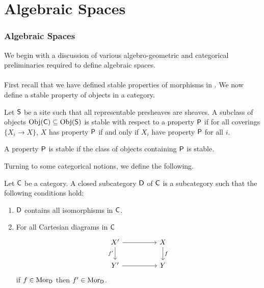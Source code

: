 \part*{Algebraic Spaces}\label{part: algebraic spaces}
\section{Algebraic Spaces}\label{sec: algebraic spaces}
We begin with a discussion of various algebro-geometric and categorical preliminaries required to define algebraic spaces. 
\\\\
First recall that we have defined stable properties of morphisms in . We now define a stable property of objects in a category. 
\begin{definition}\label{def: stable class of objects}
    Let $\mathsf{S}$ be a site such that all representable presheaves are sheaves. A subclass of objects $\mathrm{Obj}(\mathsf{C})\subseteq\mathrm{Obj}(\mathsf{S})$ is stable with respect to a property $\mathsf{P}$ if for all coverings $\{X_{i}\to X\}$, $X$ has property $\mathsf{P}$ if and only if $X_{i}$ have property $\mathsf{P}$ for all $i$. 
\end{definition}
\begin{definition}\label{def: stable property of objects}
    A property $\mathsf{P}$ is stable if the class of objects containing $\mathsf{P}$ is stable.
\end{definition}
Turning to some categorical notions, we define the following. 
\begin{definition}\label{def: closed subcategory}
    Let $\mathsf{C}$ be a category. A closed subcategory $\mathsf{D}$ of $\mathsf{C}$ is a subcategory such that the following conditions hold:
    \begin{enumerate}[label=(\alph*)]
        \item $\mathsf{D}$ contains all isomorphisms in $\mathsf{C}$.
        \item For all Cartesian diagrams in $\mathsf{C}$
        $$%
        \begin{tikzcd}
            {X'} && X \\
            {Y'} && Y
            \arrow["f", from=1-3, to=2-3]
            \arrow["{f'}"', from=1-1, to=2-1]
            \arrow[from=2-1, to=2-3]
            \arrow[from=1-1, to=1-3]
        \end{tikzcd}$$
        if $f\in\mathrm{Mor}_{\mathsf{D}}$ then $f'\in\mathrm{Mor}_{\mathsf{D}}$.
    \end{enumerate}
\end{definition}

